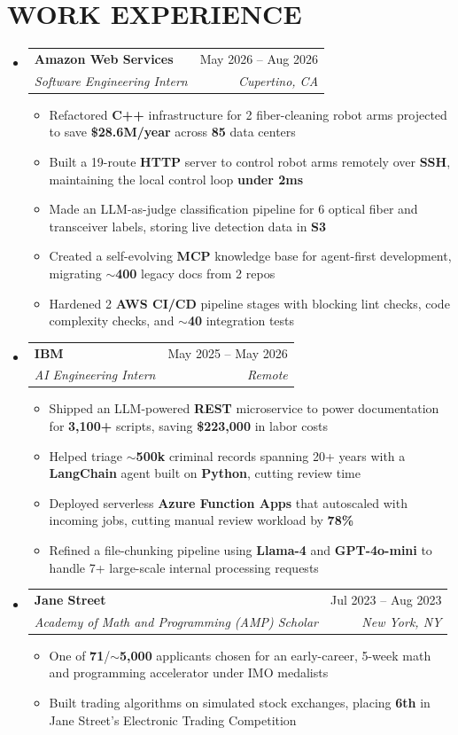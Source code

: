 \documentclass[letterpaper,11pt]{article}
\makeatletter
\newcommand{\resumeItem}[1]{
  \item\small{
    {#1 \vspace{-4pt}}
  }
}
\newcommand{\resumeSubheading}[4]{
  \item
    \begin{tabular*}{0.97\textwidth}[t]{l@{\extracolsep{\fill}}r}
      \textbf{#1} & #2 \\
      \textit{\small#3} & \textit{\small #4} \\
    \end{tabular*}\vspace{-7pt}
}
\newcommand{\resumeSubHeadingListStart}{\begin{itemize}[leftmargin=0.15in, label={}]}
\newcommand{\resumeSubHeadingListEnd}{\end{itemize}}
\newcommand{\resumeItemListStart}{\begin{itemize}}
\newcommand{\resumeItemListEnd}{\end{itemize}\vspace{-8pt}}
\makeatother
\begin{document}
\section{\textbf{WORK EXPERIENCE}}
  \resumeSubHeadingListStart
  \resumeSubheading
      {Amazon Web Services}{May 2026 -- Aug 2026}
      {Software Engineering Intern}{Cupertino, CA}
      \resumeItemListStart
        \resumeItem{Refactored \textbf{C++} infrastructure for 2 fiber-cleaning robot arms projected to save \textbf{\$28.6M/year} across \textbf{85} data centers}
        \resumeItem{Built a 19-route \textbf{HTTP} server to control robot arms remotely over \textbf{SSH}, maintaining the local control loop \textbf{under 2ms}}
        \resumeItem{Made an LLM-as-judge classification pipeline for 6 optical fiber and transceiver labels, storing live detection data in \textbf{S3}}
        \resumeItem{Created a self-evolving \textbf{MCP} knowledge base for agent-first development, migrating \textbf{$\sim$400} legacy docs from 2 repos}
        \resumeItem{Hardened 2 \textbf{AWS CI/CD} pipeline stages with blocking lint checks, code complexity checks, and \textbf{$\sim$40} integration tests}
      \resumeItemListEnd
    \resumeSubheading
      {IBM}{May 2025 -- May 2026}
      {AI Engineering Intern}{Remote}
      \resumeItemListStart
        \resumeItem{Shipped an LLM-powered \textbf{REST} microservice to power documentation for \textbf{3,100+} scripts, saving \textbf{\$223,000} in labor costs}
        \resumeItem{Helped triage \textbf{$\sim$500k} criminal records spanning 20+ years with a \textbf{LangChain} agent built on \textbf{Python}, cutting review time}
        \resumeItem{Deployed serverless \textbf{Azure Function Apps} that autoscaled with incoming jobs, cutting manual review workload by \textbf{78\%}}
        \resumeItem{Refined a file-chunking pipeline using \textbf{Llama-4} and \textbf{GPT-4o-mini} to handle 7+ large-scale internal processing requests}
      \resumeItemListEnd
    \resumeSubheading
      {Jane Street}{Jul 2023 -- Aug 2023}
      {Academy of Math and Programming (AMP) Scholar}{New York, NY}
      \resumeItemListStart
        \resumeItem{One of \textbf{71}/$\sim$\textbf{5,000} applicants chosen for an early-career, 5-week math and programming accelerator under IMO medalists}
        \resumeItem{Built trading algorithms on simulated stock exchanges, placing \textbf{6th} in Jane Street's Electronic Trading Competition}
      \resumeItemListEnd
  \resumeSubHeadingListEnd

\end{document}
